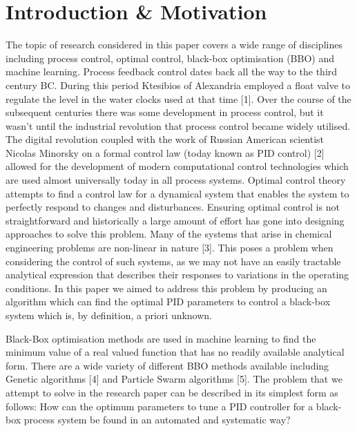 \documentclass[conference]{IEEEtran}
\theoremstyle{definition}
\begin{document}
\IEEEpeerreviewmaketitle


\section{Introduction \& Motivation}
\noindent The topic of research considered in this paper covers a wide range of disciplines including process control, optimal control, black-box optimisation (BBO) and machine learning. Process feedback control dates back all the way to the third century BC. During this period Ktesibios of Alexandria employed a float valve to regulate the level in the water clocks used at that time [1]. Over the course of the subsequent centuries there was some development in process control, but it wasn’t until the industrial revolution that process control became widely utilised. The digital revolution coupled with the work of Russian American scientist Nicolas Minorsky on a formal control law (today known as PID control) [2] allowed for the development of modern computational control technologies which are used almost universally today in all process systems. Optimal control theory attempts to find a control law for a dynamical system that enables the system to perfectly respond to changes and disturbances. Ensuring optimal control is not straightforward and historically a large amount of effort has gone into designing approaches to solve this problem. Many of the systems that arise in chemical engineering problems are non-linear in nature [3]. This poses a problem when considering the control of such systems, as we may not have an easily tractable analytical expression that describes their responses to variations in the operating conditions. In this paper we aimed to address this problem by producing an algorithm which can find the optimal PID parameters to control a black-box system which is, by definition, a priori unknown. 

\noindent Black-Box optimisation methods are used in machine learning to find the minimum value of a real valued function that has no readily available analytical form. There are a wide variety of different BBO methods available including Genetic algorithms [4] and Particle Swarm algorithms [5]. The problem that we attempt to solve in the research paper can be described in its simplest form as follows: How can the optimum parameters to tune a PID controller for a black-box process system be found in an automated and systematic way? 
\end{document}
